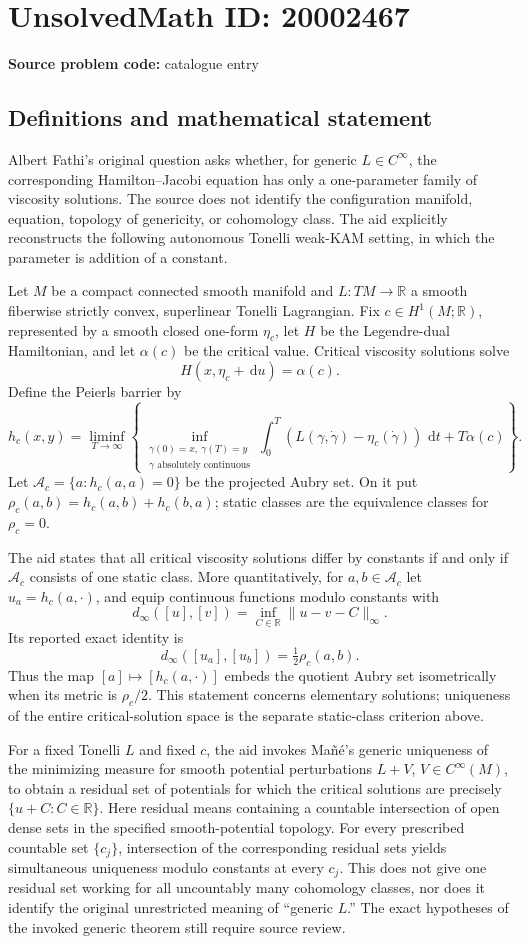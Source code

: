 \documentclass[11pt]{article}
\newcommand{\R}{\mathbb{R}}
\newcommand{\dd}{\,\mathrm{d}}
\begin{document}
\section*{UnsolvedMath ID: 20002467}
\textbf{Source problem code:} catalogue entry
\subsection{Definitions and mathematical statement}
Albert Fathi's original question asks whether, for generic $L\in C^\infty$, the corresponding Hamilton--Jacobi equation has only a one-parameter family of viscosity solutions. The source does not identify the configuration manifold, equation, topology of genericity, or cohomology class. The aid explicitly reconstructs the following autonomous Tonelli weak-KAM setting, in which the parameter is addition of a constant.

Let $M$ be a compact connected smooth manifold and $L:TM\to\R$ a smooth fiberwise strictly convex, superlinear Tonelli Lagrangian. Fix $c\in H^1(M;\R)$, represented by a smooth closed one-form $\eta_c$, let $H$ be the Legendre-dual Hamiltonian, and let $\alpha(c)$ be the critical value. Critical viscosity solutions solve
\[
 H(x,\eta_c+\dd u)=\alpha(c).
\]
Define the Peierls barrier by
\[
 h_c(x,y)=\liminf_{T\to\infty}\left\{
 \inf_{\substack{\gamma(0)=x,\ \gamma(T)=y\\\gamma\text{ absolutely continuous}}}
 \int_0^T(L(\gamma,\dot\gamma)-\eta_c(\dot\gamma))\,\dd t
 +T\alpha(c)\right\}.
\]
Let $\mathcal A_c=\{a:h_c(a,a)=0\}$ be the projected Aubry set. On it put $\rho_c(a,b)=h_c(a,b)+h_c(b,a)$; static classes are the equivalence classes for $\rho_c=0$.

The aid states that all critical viscosity solutions differ by constants if and only if $\mathcal A_c$ consists of one static class. More quantitatively, for $a,b\in\mathcal A_c$ let $u_a=h_c(a,\cdot)$, and equip continuous functions modulo constants with
\[
 d_\infty([u],[v])=\inf_{C\in\R}\|u-v-C\|_\infty.
\]
Its reported exact identity is
\[
 d_\infty([u_a],[u_b])=\tfrac12\rho_c(a,b).
\]
Thus the map $[a]\mapsto[h_c(a,\cdot)]$ embeds the quotient Aubry set isometrically when its metric is $\rho_c/2$. This statement concerns elementary solutions; uniqueness of the entire critical-solution space is the separate static-class criterion above.

For a fixed Tonelli $L$ and fixed $c$, the aid invokes Ma\~n\'e's generic uniqueness of the minimizing measure for smooth potential perturbations $L+V$, $V\in C^\infty(M)$, to obtain a residual set of potentials for which the critical solutions are precisely $\{u+C:C\in\R\}$. Here residual means containing a countable intersection of open dense sets in the specified smooth-potential topology. For every prescribed countable set $\{c_j\}$, intersection of the corresponding residual sets yields simultaneous uniqueness modulo constants at every $c_j$. This does not give one residual set working for all uncountably many cohomology classes, nor does it identify the original unrestricted meaning of ``generic $L$.'' The exact hypotheses of the invoked generic theorem still require source review.
\end{document}
